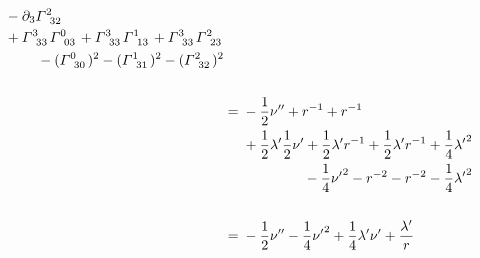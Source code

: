 \documentclass{jsarticle}
\begin{document}
\begin{align}
\begin{multlined}[t]
            - \partial_3 \tensor{\varGamma}{^2_{32}}\\
            + \tensor{\varGamma}{^3_{33}} \tensor{\varGamma}{^0_{03}}
            + \tensor{\varGamma}{^3_{33}} \tensor{\varGamma}{^1_{13}}
            + \tensor{\varGamma}{^3_{33}} \tensor{\varGamma}{^2_{23}}\\
            - (\tensor{\varGamma}{^0_{30}})^2            
            - (\tensor{\varGamma}{^1_{31}})^2
            - (\tensor{\varGamma}{^2_{32}})^2 
        \end{multlined}\\\nonumber
        \\
    &= \begin{multlined}[t]
            - \frac{1}{2}\nu'' + r^{-1} + r^{-1}\\ 
            + \frac{1}{2}\lambda'\frac{1}{2}\nu' + \frac{1}{2}\lambda'r^{-1} + \frac{1}{2}\lambda'r^{-1}
            + \frac{1}{4}{\lambda'}^2\\
            - \frac{1}{4}{\nu'}^2 - r^{-2} - r^{-2} - \frac{1}{4}{\lambda'}^2
        \end{multlined}\\\nonumber
        \\
    &= \begin{multlined}[t]
            - \frac{1}{2}\nu''-\frac{1}{4}{\nu'}^2+\frac{1}{4}{\lambda'\nu'}+\frac{\lambda'}{r}
        \end{multlined}
\end{align}
\end{document}

